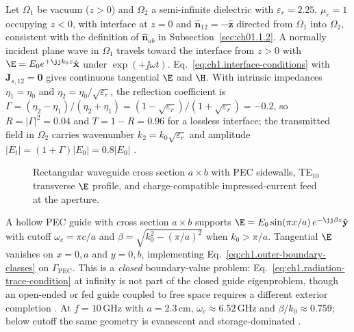 \label{prop:ch1.source-boundary-compatibility}
\begin{example}
\label{ex:ch1.dielectric-interface}
Let $\Omega_1$ be vacuum ($z>0$) and $\Omega_2$ a semi-infinite dielectric with $\varepsilon_r=2.25$, $\mu_r=1$ occupying $z<0$, with interface at $z=0$ and $\hat{\mathbf{n}}_{12}=-\hat{\mathbf{z}}$ directed from $\Omega_1$ into $\Omega_2$, consistent with the definition of $\hat{\mathbf{n}}_{ab}$ in Subsection~\ref{sec:ch01.1.2}. A normally incident plane wave in $\Omega_1$ travels toward the interface from $z>0$ with $\E=E_0 e^{+\jj k_0 z}\hat{\mathbf{x}}$ under $\exp(+\jj\omega t)$. Eq.~\eqref{eq:ch1.interface-conditions} with $\mathbf{J}_{s,12}=\mathbf{0}$ gives continuous tangential $\E$ and $\H$. With intrinsic impedances $\eta_1=\eta_0$ and $\eta_2=\eta_0/\sqrt{\varepsilon_r}$, the reflection coefficient is $\Gamma=(\eta_2-\eta_1)/(\eta_2+\eta_1)=(1-\sqrt{\varepsilon_r})/(1+\sqrt{\varepsilon_r})=-0.2$, so $R=|\Gamma|^2=0.04$ and $T=1-R=0.96$ for a lossless interface; the transmitted field in $\Omega_2$ carries wavenumber $k_2=k_0\sqrt{\varepsilon_r}$ and amplitude $|E_t|=(1+\Gamma)|E_0|=0.8|E_0|$ \cite{stratton1941,jackson1999}.
\end{example}

\begin{figure}[t]
\centering
{}
\caption{Rectangular waveguide cross section $a\times b$ with PEC sidewalls, TE$_{10}$ transverse $\E$ profile, and charge-compatible impressed-current feed at the aperture.}
\label{fig:ch1.wp-te10-waveguide}
\end{figure}
\begin{example}
\label{ex:ch1.te10-waveguide}
A hollow PEC guide with cross section $a\times b$ supports $\E=E_0\sin(\pi x/a)\,e^{-\jj\beta z}\hat{\mathbf{y}}$ with cutoff $\omega_c=\pi c/a$ and $\beta=\sqrt{k_0^2-(\pi/a)^2}$ when $k_0>\pi/a$. Tangential $\E$ vanishes on $x=0,a$ and $y=0,b$, implementing Eq.~\eqref{eq:ch1.outer-boundary-classes} on $\Gamma_{\mathrm{PEC}}$. This is a \emph{closed} boundary-value problem: Eq.~\eqref{eq:ch1.radiation-trace-condition} at infinity is not part of the closed guide eigenproblem, though an open-ended or fed guide coupled to free space requires a different exterior completion \cite{stratton1941,collin2001}. At $f=10\,\mathrm{GHz}$ with $a=2.3\,\mathrm{cm}$, $\omega_c\approx 6.52\,\mathrm{GHz}$ and $\beta/k_0\approx 0.759$; below cutoff the same geometry is evanescent and storage-dominated \cite{harrington2001}.
\end{example}

